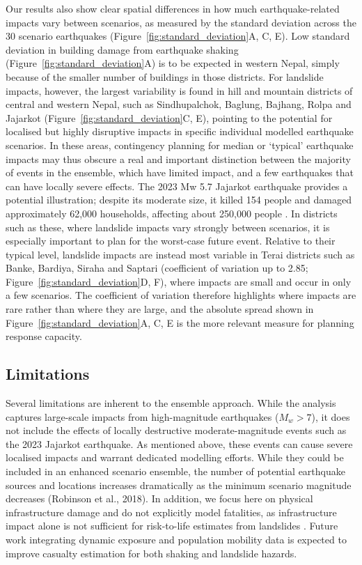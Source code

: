 \documentclass[preprint,12pt,authoryear]{elsarticle}
\begin{document}
Our results also show clear spatial differences in how much earthquake-related impacts vary between scenarios, as measured by the standard deviation across the 30 scenario earthquakes (Figure~\ref{fig:standard_deviation}A, C, E). Low standard deviation in building damage from earthquake shaking (Figure~\ref{fig:standard_deviation}A) is to be expected in western Nepal, simply because of the smaller number of buildings in those districts. For landslide impacts, however, the largest variability is found in hill and mountain districts of central and western Nepal, such as Sindhupalchok, Baglung, Bajhang, Rolpa and Jajarkot (Figure~\ref{fig:standard_deviation}C, E), pointing to the potential for localised but highly disruptive impacts in specific individual modelled earthquake scenarios. In these areas, contingency planning for median or `typical' earthquake impacts may thus obscure a real and important distinction between the majority of events in the ensemble, which have limited impact, and a few earthquakes that can have locally severe effects. The 2023 Mw 5.7 Jajarkot earthquake provides a potential illustration; despite its moderate size, it killed 154 people and damaged approximately 62,000 households, affecting about 250,000 people \citep{UNRCO2024}. In districts such as these, where landslide impacts vary strongly between scenarios, it is especially important to plan for the worst-case future event. Relative to their typical level, landslide impacts are instead most variable in Terai districts such as Banke, Bardiya, Siraha and Saptari (coefficient of variation up to 2.85; Figure~\ref{fig:standard_deviation}D, F), where impacts are small and occur in only a few scenarios. The coefficient of variation therefore highlights where impacts are rare rather than where they are large, and the absolute spread shown in Figure~\ref{fig:standard_deviation}A, C, E is the more relevant measure for planning response capacity.

\subsection{Limitations}
\label{sec:limitations}

Several limitations are inherent to the ensemble approach. While the analysis captures large-scale impacts from high-magnitude earthquakes ($M_w > 7$), it does not include the effects of locally destructive moderate-magnitude events such as the 2023 Jajarkot earthquake. As mentioned above, these events can cause severe localised impacts and warrant dedicated modelling efforts. While they could be included in an enhanced scenario ensemble, the number of potential earthquake sources and locations increases dramatically as the minimum scenario magnitude decreases (Robinson et al., 2018). In addition, we focus here on physical infrastructure damage and do not explicitly model fatalities, as infrastructure impact alone is not sufficient for risk-to-life estimates from landslides \citep{VanWykDeVries2024}. Future work integrating dynamic exposure and population mobility data is expected to improve casualty estimation for both shaking and landslide hazards.
\end{document}

